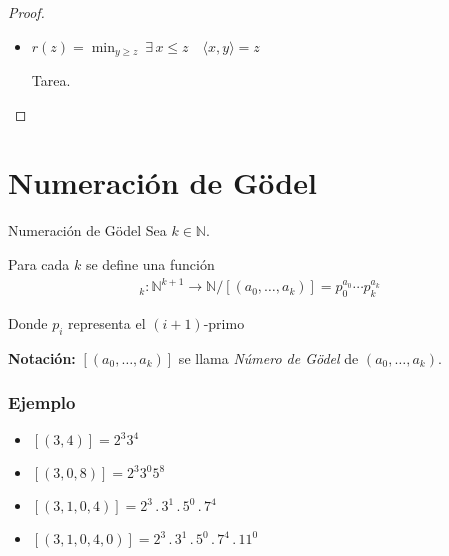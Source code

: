 \begin{proof}
\begin{itemize}
\begin{itemize}
                    Como $2^x \geq 1$
                    \begin{align*}
                        \implies& 2^x (2y+1)  \geq 2y+1 > z+1 \\
                        \implies& 2^x(2y+1)-1 > z \\
                        \implies& z > z
                    \end{align*}
                    ¡Absurdo! Por lo tanto es cierto que $y \leq z$.
                \end{itemize}

                Entonces $l$ es una función RP por composición de mínimo 
                acotado con existencial acotado con $\langle , \rangle$,
                $\mathrm{EQ}$, que son RP.

            \item $r(z) = \min_{y\geq z}{ ~\exists \, x \leq z
                \quad \langle x, y \rangle = z}$

                Tarea.
    \end{itemize}
\end{proof}


\section{Numeración de Gödel}

\begin{definicion}{Numeración de Gödel}{}
    Sea $k \in \mathbb{N}$.

    \medskip

    Para cada $k$ se define una función
    \begin{gather*}
        [\;,\;,\;]_k: \mathbb{N}^{k+1} \to \mathbb{N} / 
        [(a_0, \dotsc, a_k)] = p_0^{a_0} \cdots p_k^{a_k}
    \end{gather*}

    Donde $p_i$ representa el $(i+1)$-primo

    \bigskip
    \textbf{Notación:}
    $[(a_0, \dotsc, a_k)]$ se llama \textit{Número de Gödel} de 
    $(a_0, \dotsc, a_k)$.
\end{definicion}

\subsubsection{Ejemplo}

\begin{itemize}
    \item $[(3,4)] = 2^3 3^4$
    \item $[(3,0,8)] = 2^3 3^0 5^8$
    \item $[(3,1,0,4)] = 2^3 \, . \, 3^1 \, . \, 5^0 \, . \, 7^4$
    \item $[(3,1,0,4,0)] = 
        2^3 \, . \, 3^1 \, . \, 5^0 \, . \, 7^4 \, . \, 11^0$
\end{itemize}

